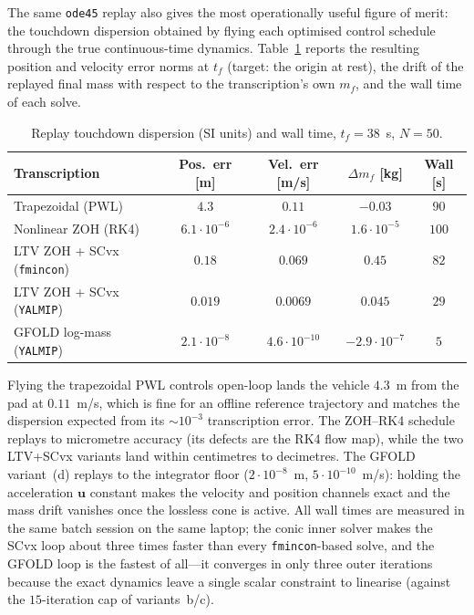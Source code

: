 \documentclass[../main.tex]{subfiles}
\begin{document}
The same \texttt{ode45} replay also gives the most operationally useful figure of merit: the touchdown dispersion obtained by flying each optimised control schedule through the true continuous-time dynamics. Table~\ref{tab:hm2_replay} reports the resulting position and velocity error norms at $t_f$ (target: the origin at rest), the drift of the replayed final mass with respect to the transcription's own $m_f$, and the wall time of each solve.

\begin{table}[H]
\centering
\small
\caption{Replay touchdown dispersion (SI units) and wall time, $t_f = 38$~s, $N = 50$.}
\label{tab:hm2_replay}
\begin{tabular}{lcccc}
\toprule
Transcription & Pos.\ err [m] & Vel.\ err [m/s] & $\Delta m_f$ [kg] & Wall [s] \\
\midrule
Trapezoidal (PWL)                 & $4.3$              & $0.11$             & $-0.03$            & $90$ \\
Nonlinear ZOH (RK4)               & $6.1\cdot 10^{-6}$ & $2.4\cdot 10^{-6}$ & $1.6\cdot 10^{-5}$ & $100$ \\
LTV ZOH + SCvx (\texttt{fmincon}) & $0.18$             & $0.069$            & $0.45$             & $82$ \\
LTV ZOH + SCvx (\texttt{YALMIP})  & $0.019$            & $0.0069$           & $0.045$            & $29$ \\
GFOLD log-mass (\texttt{YALMIP})  & $2.1\cdot 10^{-8}$ & $4.6\cdot 10^{-10}$ & $-2.9\cdot 10^{-7}$ & $5$ \\
\bottomrule
\end{tabular}
\end{table}

Flying the trapezoidal PWL controls open-loop lands the vehicle $4.3$~m from the pad at $0.11$~m/s, which is fine for an offline reference trajectory and matches the dispersion expected from its $\sim 10^{-3}$ transcription error. The ZOH--RK4 schedule replays to micrometre accuracy (its defects are the RK4 flow map), while the two LTV+SCvx variants land within centimetres to decimetres. The GFOLD variant~(d) replays to the integrator floor ($2\cdot 10^{-8}$~m, $5\cdot 10^{-10}$~m/s): holding the acceleration $\mathbf{u}$ constant makes the velocity and position channels exact and the mass drift vanishes once the lossless cone is active. All wall times are measured in the same batch session on the same laptop; the conic inner solver makes the SCvx loop about three times faster than every \texttt{fmincon}-based solve, and the GFOLD loop is the fastest of all---it converges in only three outer iterations because the exact dynamics leave a single scalar constraint to linearise (against the $15$-iteration cap of variants~b/c).
\end{document}

